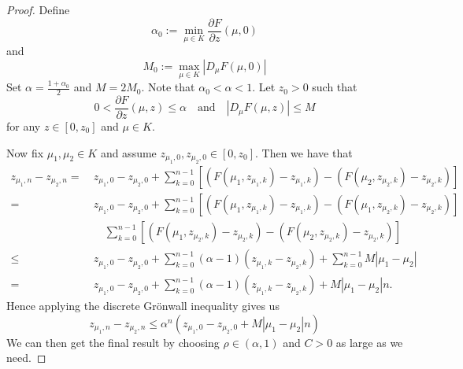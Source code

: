 \begin{proof}
	Define 
	\begin{equation}
		\alpha_0 := \min_{\mu\in K } \frac{\partial F}{\partial z} (\mu, 0) 
	\end{equation} 
	and 
	\begin{equation}
		M_0 := \max_{\mu\in K} \left| D_\mu F (\mu, 0) \right|
	\end{equation}
	Set \(\alpha = \frac{1 + \alpha_0}{2}\) and \(M = 2M_0\). Note that \(\alpha_0 < \alpha < 1\). Let \(z_0 > 0\) such that 
	\begin{equation}
		0 < \frac{\partial F}{\partial z} (\mu, z) \leq \alpha \quad \text{and} \quad \left| D_\mu F (\mu, z) \right| \leq M
	\end{equation}
	for any \(z \in [0,z_0]\) and \(\mu \in K\). 
	
	Now fix \(\mu_1,\mu_2\in K\) and assume \(z_{\mu_1, 0}, z_{\mu_2,0} \in [0,z_0]\). Then we have that 
	\begin{align*}
		z_{\mu_1, n} - z_{\mu_2, n}=\ &z_{\mu_1, 0}- z_{\mu_2, 0} + \sum_{k=0}^{n-1} [(F(\mu_1, z_{\mu_1,k} ) - z_{\mu_1, k}) - (F(\mu_2, z_{\mu_2,k} ) - z_{\mu_2, k})]\\
		=\ &z_{\mu_1, 0}- z_{\mu_2, 0} + \sum_{k=0}^{n-1} [(F(\mu_1, z_{\mu_1,k} ) - z_{\mu_1, k}) - (F(\mu_1, z_{\mu_2,k} ) - z_{\mu_2, k})] \\
		&\quad\sum_{k=0}^{n-1} [(F(\mu_1, z_{\mu_2,k} ) - z_{\mu_2, k}) - (F(\mu_2, z_{\mu_2,k} ) - z_{\mu_2, k})] \\
		\leq\ &z_{\mu_1, 0}- z_{\mu_2, 0} + \sum_{k=0}^{n-1} (\alpha - 1) (z_{\mu_1, k}- z_{\mu_2, k}) +\sum_{k=0}^{n-1} M|\mu_1 - \mu_2| \\
		=\ &z_{\mu_1, 0}- z_{\mu_2, 0} + \sum_{k=0}^{n-1} (\alpha - 1) (z_{\mu_1, k}- z_{\mu_2, k}) +M|\mu_1 - \mu_2| n.
	\end{align*}
	Hence applying the discrete Gr\"onwall inequality gives us
	\begin{equation}
		z_{\mu_1, n} - z_{\mu_2, n} \leq \alpha^n(z_{\mu_1, 0}- z_{\mu_2, 0} + M |\mu_1-\mu_2| n)
	\end{equation}
	We can then get the final result by choosing \(\rho \in (\alpha, 1)\) and \(C>0\) as large as we need.
\end{proof}

